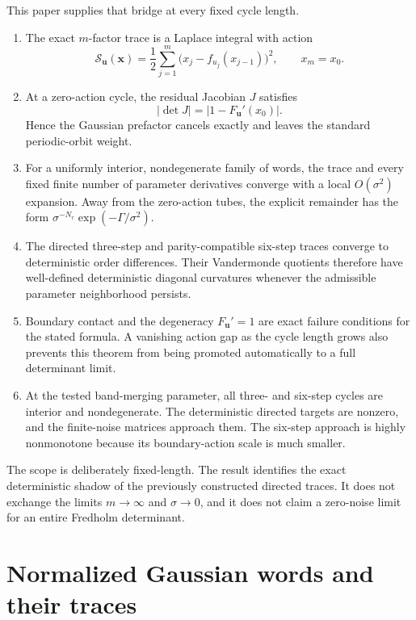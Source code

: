 \documentclass[11pt]{article}
\theoremstyle{remark}
\newcommand{\cS}{\mathcal S}
\newcommand{\bu}{\boldsymbol u}
\newcommand{\bx}{\boldsymbol x}
\begin{document}
This paper supplies that bridge at every fixed cycle length.
\begin{enumerate}[label=\textbf{R\arabic*.},leftmargin=3.1em]
 \item The exact $m$-factor trace is a Laplace integral with action
 \[
  \cS_{\bu}(\bx)=\frac12\sum_{j=1}^{m}
  \bigl(x_j-f_{u_j}(x_{j-1})\bigr)^2,
  \qquad x_m=x_0.
 \]

 \item At a zero-action cycle, the residual Jacobian $J$ satisfies
 \[
  |\det J|=|1-F_{\bu}'(x_0)|.
 \]
 Hence the Gaussian prefactor cancels exactly and leaves the standard
 periodic-orbit weight.

 \item For a uniformly interior, nondegenerate family of words, the trace and
 every fixed finite number of parameter derivatives converge with a local
 $O(\sigma^2)$ expansion.  Away from the zero-action tubes, the explicit
 remainder has the form
 $\sigma^{-N_r}\exp(-\Gamma/\sigma^2)$.

 \item The directed three-step and parity-compatible six-step traces converge
 to deterministic order differences.  Their Vandermonde quotients therefore
 have well-defined deterministic diagonal curvatures whenever the admissible
 parameter neighborhood persists.

 \item Boundary contact and the degeneracy $F_{\bu}'=1$ are exact failure
 conditions for the stated formula.  A vanishing action gap as the cycle
 length grows also prevents this theorem from being promoted automatically to
 a full determinant limit.

 \item At the tested band-merging parameter, all three- and six-step cycles are
 interior and nondegenerate.  The deterministic directed targets are nonzero,
 and the finite-noise matrices approach them.  The six-step approach is highly
 nonmonotone because its boundary-action scale is much smaller.
\end{enumerate}

The scope is deliberately fixed-length.  The result identifies the exact
deterministic shadow of the previously constructed directed traces.  It does
not exchange the limits $m\to\infty$ and $\sigma\to0$, and it does not claim a
zero-noise limit for an entire Fredholm determinant.

\section{Normalized Gaussian words and their traces}
\label{sec:operators}
\end{document}
